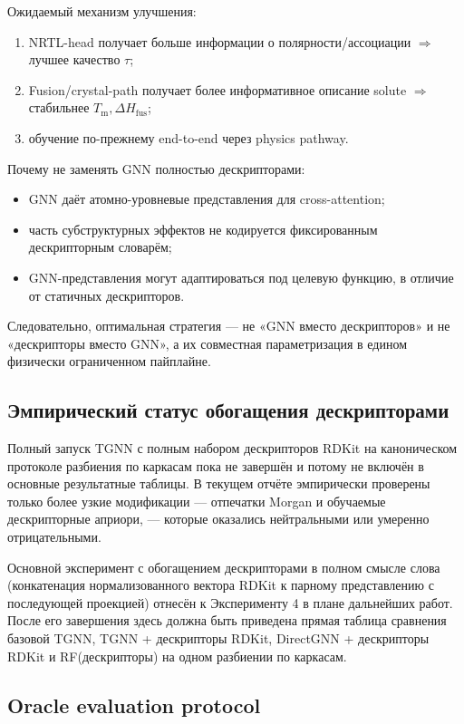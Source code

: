 \documentclass[11pt]{article}
\begin{document}
Ожидаемый механизм улучшения:
\begin{enumerate}
  \item NRTL-head получает больше информации о полярности/ассоциации $\Rightarrow$ лучшее качество $\tau$;
  \item Fusion/crystal-path получает более информативное описание solute $\Rightarrow$ стабильнее $T_{\mathrm{m}},\Delta H_{\mathrm{fus}}$;
  \item обучение по-прежнему end-to-end через physics pathway.
\end{enumerate}

Почему не заменять GNN полностью дескрипторами:
\begin{itemize}
  \item GNN даёт атомно-уровневые представления для cross-attention;
  \item часть субструктурных эффектов не кодируется фиксированным дескрипторным словарём;
  \item GNN-представления могут адаптироваться под целевую функцию, в отличие от статичных дескрипторов.
\end{itemize}

Следовательно, оптимальная стратегия --- не «GNN вместо дескрипторов» и не «дескрипторы вместо GNN», а их совместная параметризация в едином физически ограниченном пайплайне.

\subsection{Эмпирический статус обогащения дескрипторами}

Полный запуск TGNN с полным набором дескрипторов RDKit на каноническом протоколе разбиения по каркасам пока не завершён и потому не включён в основные результатные таблицы. В текущем отчёте эмпирически проверены только более узкие модификации --- отпечатки Morgan и обучаемые дескрипторные априори, --- которые оказались нейтральными или умеренно отрицательными.

Основной эксперимент с обогащением дескрипторами в полном смысле слова (конкатенация нормализованного вектора RDKit к парному представлению с последующей проекцией) отнесён к Эксперименту 4 в плане дальнейших работ. После его завершения здесь должна быть приведена прямая таблица сравнения базовой TGNN, TGNN + дескрипторы RDKit, DirectGNN + дескрипторы RDKit и RF(дескрипторы) на одном разбиении по каркасам.

\subsection{Oracle evaluation protocol}
\end{document}
